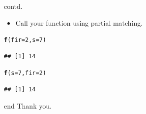 \documentclass{beamer}\usepackage[]{graphicx}\usepackage[]{color}
\makeatletter
\newcommand{\hlnum}[1]{\textcolor[rgb]{0.686,0.059,0.569}{#1}}%
\newcommand{\hlstd}[1]{\textcolor[rgb]{0.345,0.345,0.345}{#1}}%
\newcommand{\hlkwc}[1]{\textcolor[rgb]{0.333,0.667,0.333}{#1}}%
\newcommand{\hlkwd}[1]{\textcolor[rgb]{0.737,0.353,0.396}{\textbf{#1}}}%
\newenvironment{kframe}{%
 \def\at@end@of@kframe{}%
 \ifinner\ifhmode%
  \def\at@end@of@kframe{\end{minipage}}%
  \begin{minipage}{\columnwidth}%
 \fi\fi%
 \def\FrameCommand##1{\hskip\@totalleftmargin \hskip-\fboxsep
 \colorbox{shadecolor}{##1}\hskip-\fboxsep
     \hskip-\linewidth \hskip-\@totalleftmargin \hskip\columnwidth}%
 \MakeFramed {\advance\hsize-\width
   \@totalleftmargin\z@ \linewidth\hsize
   \@setminipage}}%
 {\par\unskip\endMakeFramed%
 \at@end@of@kframe}
\newenvironment{knitrout}{}{} %
\makeatother
\begin{document}
\begin{frame}[fragile]{contd.}

\begin{itemize}
\item Call your function using partial matching.
\end{itemize}
\begin{knitrout}
\color{fgcolor}\begin{kframe}
\begin{alltt}
\hlkwd{f}\hlstd{(}\hlkwc{fir}\hlstd{=}\hlnum{2}\hlstd{,} \hlkwc{s}\hlstd{=}\hlnum{7}\hlstd{)}
\end{alltt}
\begin{verbatim}
## [1] 14
\end{verbatim}
\begin{alltt}
\hlkwd{f}\hlstd{(}\hlkwc{s}\hlstd{=}\hlnum{7}\hlstd{,} \hlkwc{fir}\hlstd{=}\hlnum{2}\hlstd{)}
\end{alltt}
\begin{verbatim}
## [1] 14
\end{verbatim}
\end{kframe}
\end{knitrout}


\end{frame}



\begin{frame}[fragile]{end}
Thank you.
\end{frame}
\end{document}
